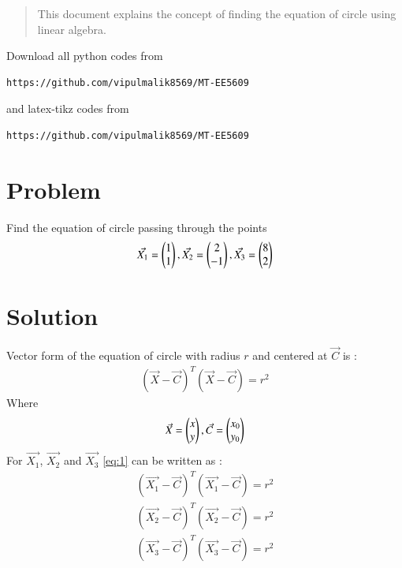 \documentclass[journal,12pt,twocolumn]{IEEEtran}
\begin{document}
\date{\today}

\maketitle
\newpage
\bigskip
\renewcommand{\thefigure}{\theenumi}
\renewcommand{\thetable}{\theenumi}

\begin{abstract}
This document explains the concept of finding the equation of circle using linear algebra.
\end{abstract}
Download all python codes from 
\begin{lstlisting}
https://github.com/vipulmalik8569/MT-EE5609
\end{lstlisting}
and latex-tikz codes from 
\begin{lstlisting}
https://github.com/vipulmalik8569/MT-EE5609
\end{lstlisting}
\section{\textbf{Problem}}
Find the equation of circle passing through the points
\begin{align}
    \Vec{X_1}=\begin{pmatrix}1\\1\end{pmatrix}, \Vec{X_2}=\begin{pmatrix}2\\-1\end{pmatrix}, \Vec{X_3}=\begin{pmatrix}8\\2\end{pmatrix}\label{eq:0}
\end{align}
\section{\textbf{Solution}}
Vector form of the equation of circle with radius $r$ and centered at $\Vec{C}$ is :
\begin{align}
(\Vec{X}-\Vec{C})^T(\Vec{X}-\Vec{C})=r^2\label{eq:1}
\end{align}
Where
\begin{align}
\Vec{X}=\begin{pmatrix}x\\y\end{pmatrix}, \Vec{C}=\begin{pmatrix}x_0\\y_0\end{pmatrix} 
\end{align}
For $\Vec{X_1}$, $\Vec{X_2}$ and $\Vec{X_3}$ \eqref{eq:1} can be written as :
\begin{align}
(\Vec{X_1}-\Vec{C})^T(\Vec{X_1}-\Vec{C})=r^2\\
(\Vec{X_2}-\Vec{C})^T(\Vec{X_2}-\Vec{C})=r^2\\
(\Vec{X_3}-\Vec{C})^T(\Vec{X_3}-\Vec{C})=r^2
\end{align}
\end{document}
